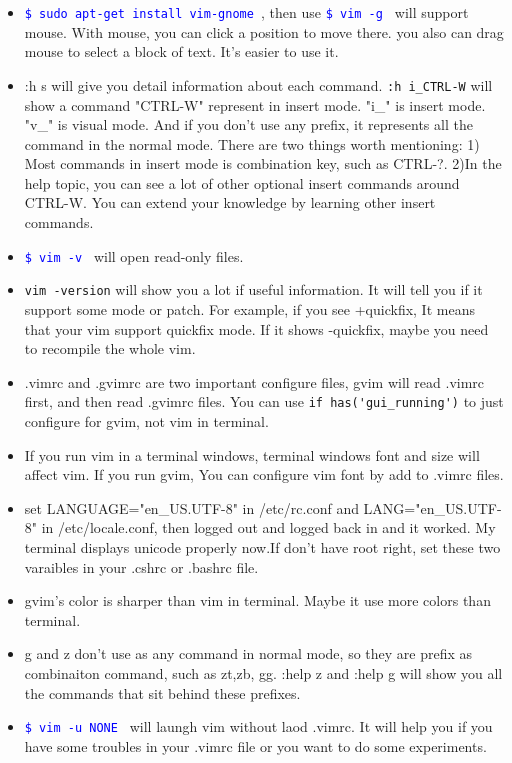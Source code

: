 \documentclass[a4paper,12pt,twoside]{book}
\newcommand{\linuxcommand}[1]{\texttt{\textcolor{blue}{\$ #1 \Pisymbol{psy}{191}}}}
\begin{document}
\begin{itemize}
\item \linuxcommand{sudo apt-get install vim-gnome}, then use \linuxcommand{vim -g} will support mouse.  With mouse, you can click a position to move there. you also can drag mouse to select a block of text. It's easier to use it. 

\item :h s will give you detail information about each command. \verb=:h i_CTRL-W= will show a command "CTRL-W" represent in insert mode. "i\_" is insert mode. "v\_" is visual mode. And if you don't use any prefix, it represents all the command in the normal mode. There are two things worth mentioning: 1) Most commands in insert mode is combination key, such as CTRL-?. 2)In the help topic, you can see a lot of other optional insert commands around CTRL-W. You can extend your knowledge by learning other insert commands.

\item \linuxcommand{vim -v} will open read-only files. 

\item \verb=vim -version= will show you a lot if useful information. It will tell you if it support some mode or patch. For example, if you see +quickfix, It means that your vim support quickfix mode. If it shows -quickfix, maybe you need to recompile the whole vim.

\item .vimrc and .gvimrc are two important configure files, gvim  will read .vimrc first, and then read .gvimrc files.  You can use \verb=if has('gui_running')= to just configure for gvim, not vim in terminal. 

\item If you run vim in a terminal windows, terminal windows font and size will affect vim.  If you run gvim, You can configure vim font by add to .vimrc files.  

\item set LANGUAGE="en\_US.UTF-8" in /etc/rc.conf and LANG="en\_US.UTF-8" in /etc/locale.conf, then logged out and logged back in and it worked. My terminal displays unicode properly now.If don't have root right, set these two varaibles in your .cshrc or .bashrc file.

\item gvim's color is sharper than vim in terminal.  Maybe it use more colors than terminal.  

\item g and z don't use as any command in normal mode, so they are prefix as combinaiton command, such as zt,zb, gg. :help z and :help g will show you all the commands that sit behind these prefixes.
\item \linuxcommand{vim -u NONE} will laungh vim without laod .vimrc. It will help you if you have some troubles in your .vimrc file or you want to do some experiments. 
\end{itemize}
\end{document}
